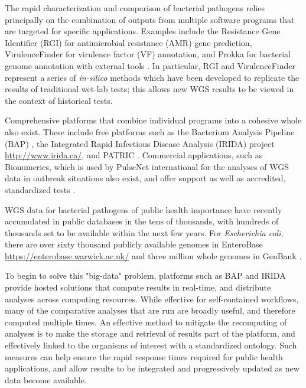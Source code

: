 \documentclass[a4,center,fleqn]{NAR}
\begin{document}
The rapid characterization and comparison of bacterial pathogens relies principally on the combination of outputs from multiple software programs that are targeted for specific applications. Examples include the Resistance Gene Identifier (RGI) \cite{mcarthur2013comprehensive} for antimicrobial resistance (AMR) gene prediction, VirulenceFinder \cite{kleinheinz2014applying} for virulence factor (VF) annotation, and Prokka for bacterial genome annotation with external tools \cite{doi:10.1093/bioinformatics/btu153}. In particular, RGI and VirulenceFinder represent a series of \textit{in-silico} methods which have been developed to replicate the results of traditional wet-lab tests; this allows new WGS results to be viewed in the context of historical tests.

Comprehensive platforms that combine individual programs into a cohesive whole also exist. These include free platforms such as the Bacterium Analysis Pipeline (BAP) \cite{thomsen2016bacterial}, the Integrated Rapid Infectious Disease Analysis (IRIDA) project \url{http://www.irida.ca/}, and PATRIC \cite{wattam2013patric}. Commercial applications, such as Bionumerics, which is used by PulseNet international for the analyses of WGS data in outbreak situations also exist, and offer support as well as accredited, standardized tests \cite{swaminathan2001pulsenet}.

WGS data for bacterial pathogens of public health importance have recently accumulated in public databases in the tens of thousands, with hundreds of thousands set to be available within the next few years. For \textit{Escherichia coli}, there are over sixty thousand publicly available genomes in EnteroBase \url{https://enterobase.warwick.ac.uk/} and three million whole genomes in GenBank \cite{doi:10.1093/nar/gks1195}.

To begin to solve this "big-data" problem, platforms such as BAP and IRIDA provide hosted solutions that compute results in real-time, and distribute analyses across computing resources. While effective for self-contained workflows, many of the comparative analyses that are run are broadly useful, and therefore computed multiple times. An effective method to mitigate the recomputing of analyses is to make the storage and retrieval of results part of the platform, and effectively linked to the organisms of interest with a standardized ontology. Such measures can help ensure the rapid response times required for public health applications, and allow results to be integrated and progressively updated as new data become available.
\end{document}
